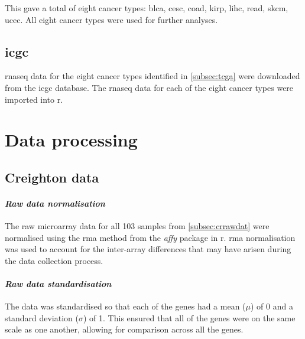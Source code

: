 This gave a total of eight cancer types: \gls{blca}, \gls{cesc}, \gls{coad}, \gls{kirp}, \gls{lihc}, \gls{read}, \gls{skcm}, \gls{ucec}.
All eight cancer types were used for further analyses.

\subsection{\gls{icgc}}
\label{subsec:icgc}

\gls{rnaseq} data for the eight cancer types identified in \cref{subsec:tcga} were downloaded from the \gls{icgc} database.
The \gls{rnaseq} data for each of the eight cancer types were imported into \gls{r}.





\section{Data processing}
\label{sec:datproc}

\subsection{Creighton data}
\label{subsec:crdatproc}


\paragraph{\textit{Raw data normalisation}}

The raw microarray data for all 103 samples from \cref{subsec:crrawdat} were normalised using the \gls{rma} method from the \textit{affy} package in \gls{r}.
\gls{rma} normalisation was used to account for the inter-array differences that may have arisen during the data collection process.

\paragraph{\textit{ Raw data standardisation }}

The data was standardised so that each of the genes had a mean ($\mu$) of 0 and a standard deviation ($\sigma$) of 1.
This ensured that all of the genes were on the same scale as one another, allowing for comparison across all the genes.

